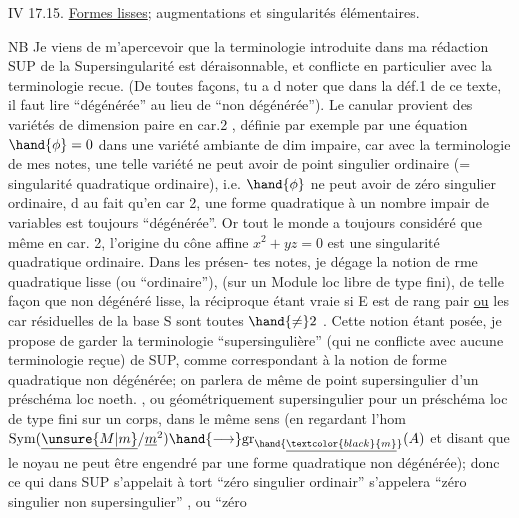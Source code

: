  

IV 17.15. \uline{Formes lisses}; augmentations et singularités élémentaires. 

NB Je viens de m'apercevoir \hand{\textsuperscript{\unsure{$\dagger$}}}que la terminologie introduite dans
ma rédaction SUP de la Supersingularité est déraisonnable, et conflicte
en particulier avec la terminologie recue. (De toutes façons, tu a d\hand{\^{\textcolor{black}{u}}}
noter que dans la déf.1 de ce texte, il faut lire ``dégénérée'' au lieu de
``non dégénérée''). Le canular provient des variétés de dimension paire
en car.2 ,  définie par exemple par une équation $\hand{\phi}=0$
dans une variété ambiante de dim impaire, car avec la terminologie de mes
notes, une telle variété ne peut avoir de  point singulier
ordinaire (= singularité quadratique ordinaire), i.e. $\hand{\phi}$ ne peut avoir
de zéro singulier ordinaire, d\hand{\^{\textcolor{black}{u}}} au fait qu'en car 2, une forme quadratique
à un nombre impair de variables est toujours ``dégénérée''. Or tout le
monde a toujours considéré que même en car. 2, l'origine du cône affine
$x^2 + yz = 0$ est une singularité quadratique ordinaire. Dans les présen-%
tes notes, je dégage la notion de rme quadratique lisse (ou ``ordinaire''),
(sur un Module loc libre de type fini), de telle façon que
non dégénéré \hand{$\Longrightarrow$} lisse, la réciproque étant vraie si E est de rang pair
\uline{ou} les car résiduelles de la base S sont toutes $\hand{\neq} 2$ . Cette notion étant
posée, je propose de garder la terminologie ``supersingulière'' (qui ne
conflicte avec aucune terminologie reçue)  de SUP,
comme correspondant à la notion de forme quadratique non dégénérée; on
parlera de même de point supersingulier d'un préschéma loc noeth. , ou
géométriquement supersingulier pour un préschéma loc de type fini sur un
corps, dans le même sens (en regardant l'hom $\mathrm{Sym}(\underline{\unsure{M|m}}/\underline{m}^2) \hand{\longrightarrow} \mathrm{gr}_{\hand{\underline{\textcolor{black}{m}}}}(A)$ et
 disant que le noyau ne peut être engendré par une forme quadratique
non dégénérée); donc ce qui dans SUP s'appelait à tort ``zéro singulier
ordinair'' s'appelera ``zéro singulier non supersingulier'' , ou ``zéro

